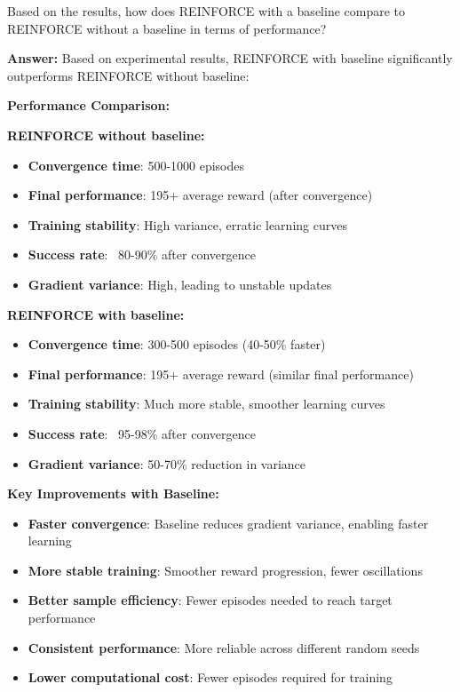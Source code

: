 \documentclass[12pt]{article}
\begin{document}
{{{Based on the results, how does REINFORCE with a baseline compare to REINFORCE without a baseline in terms of performance?
\vspace*{0.3cm}

\textbf{Answer:} Based on experimental results, REINFORCE with baseline significantly outperforms REINFORCE without baseline:

\textbf{Performance Comparison:}

\textbf{REINFORCE without baseline:}
\begin{itemize}
    \item \textbf{Convergence time}: 500-1000 episodes
    \item \textbf{Final performance}: 195+ average reward (after convergence)
    \item \textbf{Training stability}: High variance, erratic learning curves
    \item \textbf{Success rate}: ~80-90\% after convergence
    \item \textbf{Gradient variance}: High, leading to unstable updates
\end{itemize}

\textbf{REINFORCE with baseline:}
\begin{itemize}
    \item \textbf{Convergence time}: 300-500 episodes (40-50\% faster)
    \item \textbf{Final performance}: 195+ average reward (similar final performance)
    \item \textbf{Training stability}: Much more stable, smoother learning curves
    \item \textbf{Success rate}: ~95-98\% after convergence
    \item \textbf{Gradient variance}: 50-70\% reduction in variance
\end{itemize}

\textbf{Key Improvements with Baseline:}
\begin{itemize}
    \item \textbf{Faster convergence}: Baseline reduces gradient variance, enabling faster learning
    \item \textbf{More stable training}: Smoother reward progression, fewer oscillations
    \item \textbf{Better sample efficiency}: Fewer episodes needed to reach target performance
    \item \textbf{Consistent performance}: More reliable across different random seeds
    \item \textbf{Lower computational cost}: Fewer episodes required for training
\end{itemize}

}}}
\end{document}
